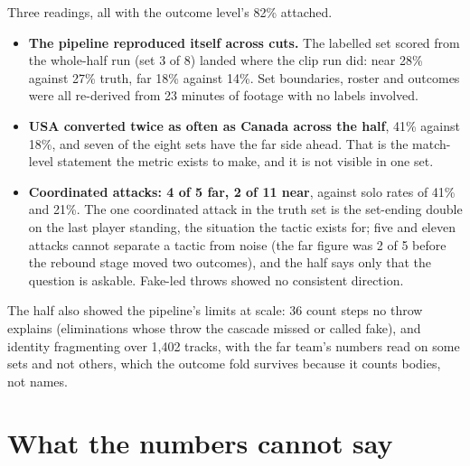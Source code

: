 \documentclass[10pt,a4paper]{article}
\begin{document}
Three readings, all with the outcome level's 82\% attached.

\begin{itemize}
\item \textbf{The pipeline reproduced itself across cuts.} The labelled set scored from the
whole-half run (set 3 of 8) landed where the clip run did: near 28\% against 27\% truth,
far 18\% against 14\%. Set boundaries, roster and outcomes were all re-derived from 23
minutes of footage with no labels involved.
\item \textbf{USA converted twice as often as Canada across the half}, 41\% against 18\%,
and seven of the eight sets have the far side ahead. That is the match-level statement the
metric exists to make, and it is not visible in one set.
\item \textbf{Coordinated attacks: 4 of 5 far, 2 of 11 near}, against solo rates of 41\%
and 21\%. The one coordinated attack in the truth set is the set-ending double on the last
player standing, the situation the tactic exists for; five and eleven attacks cannot separate a
tactic from noise (the far figure was 2 of 5 before the rebound stage moved two outcomes),
and the half says only that the question is askable. Fake-led throws showed no consistent
direction.
\end{itemize}

The half also showed the pipeline's limits at scale: 36 count steps no throw explains
(eliminations whose throw the cascade missed or called fake), and identity fragmenting over
1,402 tracks, with the far team's numbers read on some sets and not others, which the
outcome fold survives because it counts bodies, not names.

\section{What the numbers cannot say}
\label{sec:uncertain}
\end{document}
